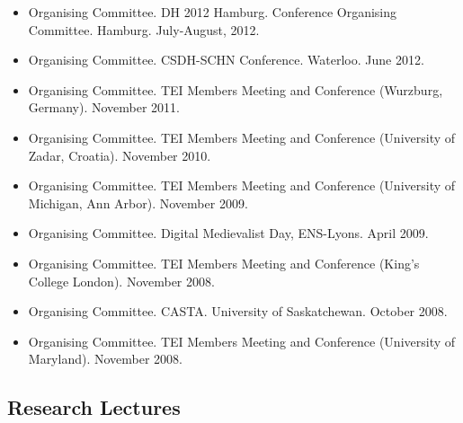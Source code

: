 \documentclass[12pt]{article}
\begin{document}
\begin{itemize}
  \item Organising Committee. DH 2012 Hamburg. Conference Organising Committee. Hamburg. July-August, 2012.
  \item Organising Committee. CSDH-SCHN Conference. Waterloo. June 2012.
  \item Organising Committee. TEI Members Meeting and Conference (Wurzburg, Germany). November 2011.
  \item Organising Committee. TEI Members Meeting and Conference (University of Zadar, Croatia). November 2010.
  \item Organising Committee. TEI Members Meeting and Conference (University of Michigan, Ann Arbor). November 2009.
  \item Organising Committee. Digital Medievalist Day, ENS-Lyons. April 2009.
  \item Organising Committee. TEI Members Meeting and Conference (King's College London). November 2008.
  \item Organising Committee. CASTA. University of Saskatchewan. October 2008.
  \item Organising Committee. TEI Members Meeting and Conference (University of Maryland). November 2008.
\end{itemize}


\subsection*{Research Lectures}
\end{document}

